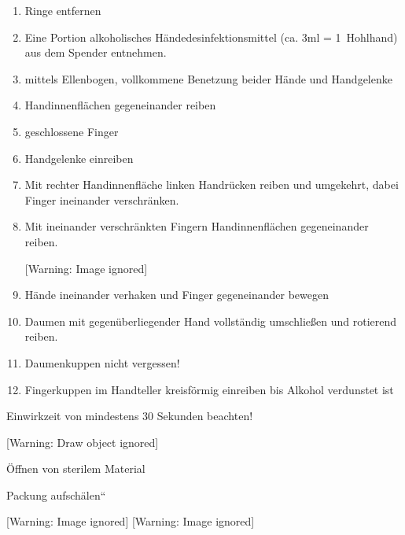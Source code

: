 \documentclass{article}
\begin{document}
\begin{enumerate}
\item Ringe entfernen 

\item Eine Portion alkoholisches H\"andedesinfektionsmittel (ca. 3ml =
1~Hohlhand) aus dem Spen\-der entnehmen. 

\item mittels Ellenbogen, vollkommene Benetzung beider H\"ande und
Handgelenke 

\item Handinnenfl\"achen gegeneinander reiben

\item geschlossene Finger 

\item Handgelenke einreiben

\item Mit rechter Handinnenfl\"ache linken Handr\"ucken reiben und
umgekehrt, dabei Finger ineinander verschr\"anken.

\item Mit ineinander verschr\"ankten Fingern Handinnenfl\"achen
gegeneinander reiben. 

\begin{center}
 [Warning: Image ignored] %

\end{center}
\item H\"ande ineinander verhaken und Finger gegeneinander bewegen

\item Daumen mit gegen\"uberliegender Hand vollst\"andig umschlie{\ss}en
und rotierend reiben. 

\item Daumenkuppen nicht vergessen!

\item Fingerkuppen im Handteller kreisf\"ormig einreiben bis Alkohol
verdunstet ist

\end{enumerate}
 Einwirkzeit von mindestens 30 Sekunden beachten! 

[Warning: Draw object ignored]

\"Offnen von sterilem Material

Packung {\quotedblbase}aufsch\"alen{\textquotedblleft} 

  [Warning: Image ignored] %
    [Warning: Image ignored] %
 
\end{document}
